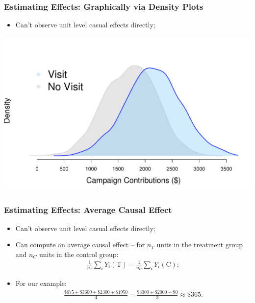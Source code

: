 \documentclass[aspectratio=169]{beamer}
\theoremstyle{principle}
\begin{document}
\begin{frame}
\frametitle{Estimating Effects: Graphically via Density Plots}
\begin{itemize}
\item Can't observe unit level casual effects directly;
\end{itemize}
\begin{center}
\includegraphics[scale=0.45]{causal_inference.pdf}
\end{center}
\end{frame}

\begin{frame}
\frametitle{Estimating Effects: Average Causal Effect}
\begin{itemize}
\item Can't observe unit level casual effects directly;
\bigskip
\bigskip
\item Can compute an average causal effect -- for $n_T$ units in the treatment group and $n_C$ units in the control group:
\begin{align*}
\frac{1}{n_T}\sum_iY_i(\mbox{T}) - \frac{1}{n_C}\sum_iY_i(\mbox{C});
\end{align*}
\bigskip
\item For our example:
\begin{align*}
\frac{\$675 + \$3600 + \$2300 + \$1950}{4} - \frac{\$3300 + \$2000 + \$0}{3} \approx \$365.
\end{align*}
\end{itemize}
\end{frame}
\end{document}
